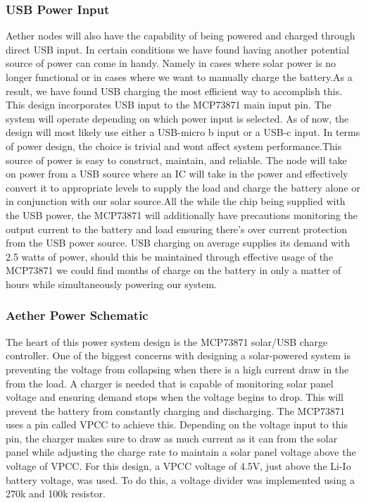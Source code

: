 \subsubsection{USB Power Input}
Aether nodes will also have the capability of being powered and charged through direct USB input. In certain conditions we have found having another potential source of power can come in handy. Namely in cases where solar power is no longer functional or in cases where we want to manually charge the battery.As a result, we have found USB charging the most efficient way to accomplish this. This design incorporates USB input to the MCP73871 main input pin. The system will operate depending on which power input is selected. As of now, the design will most likely use either a USB-micro b input or a USB-c input. In terms of power design, the choice is trivial and wont affect system performance.This source of power is easy to construct, maintain, and reliable. The node will take on power from a USB source where an IC will take in the power and effectively convert it to appropriate levels to supply the load and charge the battery alone or in conjunction with our solar source.All the while the chip being supplied with the USB power, the MCP73871 will additionally have precautions monitoring the output current to the battery and load ensuring there's over current protection from the USB power source. USB charging on average supplies its demand with 2.5 watts of power, should this be maintained through effective usage of the MCP73871 we could find months of charge on the battery in only a matter of hours while simultaneously powering our system.

\subsubsection{Aether Power Schematic}
The heart of this power system design is the MCP73871 solar/USB charge controller. One of the biggest concerns with designing a solar-powered system is preventing the voltage from collapsing when there is a high current draw in the from the load. A charger is needed that is capable of monitoring solar panel voltage and ensuring demand stops when the voltage begins to drop. This will prevent the battery from constantly charging and discharging. The MCP73871 uses a pin called VPCC to achieve this. Depending on the voltage input to this pin, the charger makes sure to draw as much current as it can from the solar panel while adjusting the charge rate to maintain a solar panel voltage above the voltage of VPCC. For this design, a VPCC voltage of 4.5V, just above the Li-Io battery voltage, was used. To do this, a voltage divider was implemented using a 270k and 100k resistor.

